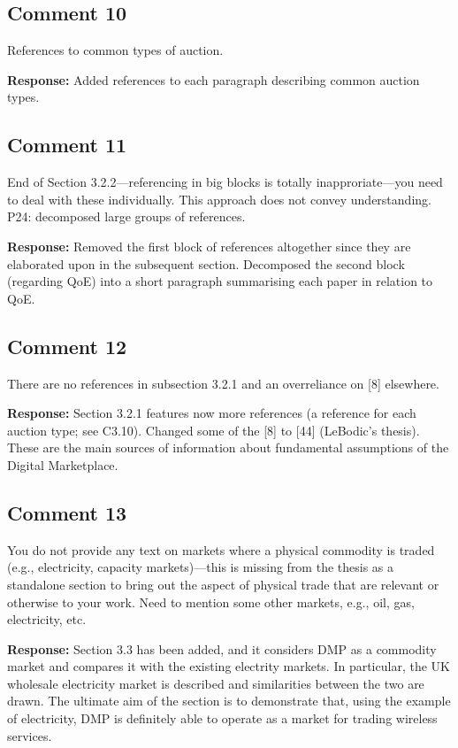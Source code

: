 \documentclass[10pt,a4paper,notitlepage]{article}
\numberwithin{equation}{section}
\begin{document}
\subsection{Comment 10}
References to common types of auction.

\textbf{Response:}
Added references to each paragraph describing common auction types.

\subsection{Comment 11}
End of Section 3.2.2---referencing in big blocks is totally inapproriate---you need to deal with these individually. This approach does not convey understanding. P24: decomposed large groups of references.

\textbf{Response:}
Removed the first block of references altogether since they are elaborated upon in the subsequent section. Decomposed the second block (regarding QoE) into a short paragraph summarising each paper in relation to QoE.

\subsection{Comment 12}
There are no references in subsection 3.2.1 and an overreliance on [8] elsewhere.

\textbf{Response:}
Section 3.2.1 features now more references (a reference for each auction type; see C3.10). Changed some of the [8] to [44] (LeBodic's thesis). These are the main sources of information about fundamental assumptions of the Digital Marketplace.

\subsection{Comment 13}
You do not provide any text on markets where a physical commodity is traded (e.g., electricity, capacity markets)---this is missing from the thesis as a standalone section to bring out the aspect of physical trade that are relevant or otherwise to your work. Need to mention some other markets, e.g., oil, gas, electricity, etc.

\textbf{Response:}
Section 3.3 has been added, and it considers DMP as a commodity market and compares it with the existing electrity markets. In particular, the UK wholesale electricity market is described and similarities between the two are drawn. The ultimate aim of the section is to demonstrate that, using the example of electricity, DMP is definitely able to operate as a market for trading wireless services. 
\end{document}
